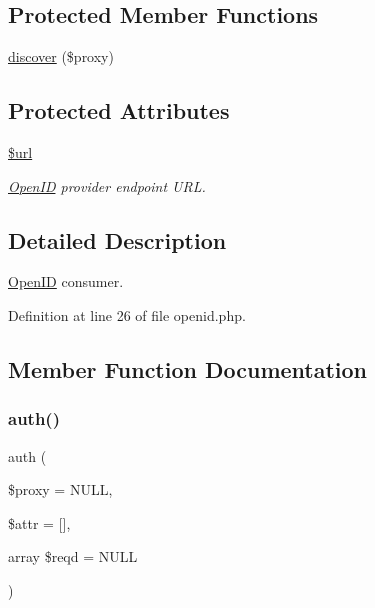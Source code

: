 \subsection*{Protected Member Functions}
\begin{DoxyCompactItemize}
\item 
\hyperlink{class_web_1_1_open_i_d_a8fe09384f979cc36cabfcc675e1de1d7}{discover} (\$proxy)
\end{DoxyCompactItemize}
\subsection*{Protected Attributes}
\begin{DoxyCompactItemize}
\item 
\hypertarget{class_web_1_1_open_i_d_acf215f34a917d014776ce684a9ee8909}{}\label{class_web_1_1_open_i_d_acf215f34a917d014776ce684a9ee8909} 
\hyperlink{class_web_1_1_open_i_d_acf215f34a917d014776ce684a9ee8909}{\$url}
\begin{DoxyCompactList}\small\item\em \hyperlink{class_web_1_1_open_i_d}{Open\+ID} provider endpoint U\+RL. \end{DoxyCompactList}\end{DoxyCompactItemize}


\subsection{Detailed Description}
\hyperlink{class_web_1_1_open_i_d}{Open\+ID} consumer. 

Definition at line 26 of file openid.\+php.



\subsection{Member Function Documentation}
\hypertarget{class_web_1_1_open_i_d_a83c8bf3d9d47536f727fce44c00de4f0}{}\label{class_web_1_1_open_i_d_a83c8bf3d9d47536f727fce44c00de4f0} 
\subsubsection{\texorpdfstring{auth()}{auth()}}
{\footnotesize\ttfamily auth (\begin{DoxyParamCaption}\item[{}]{\$proxy = {\ttfamily NULL},  }\item[{}]{\$attr = {\ttfamily \mbox{[}\mbox{]}},  }\item[{array}]{\$reqd = {\ttfamily NULL} }\end{DoxyParamCaption})}

